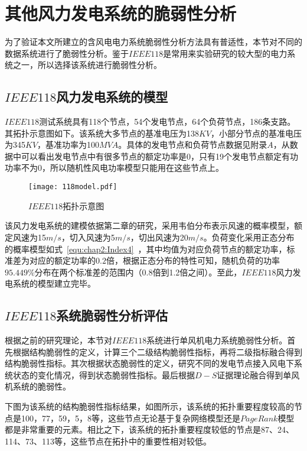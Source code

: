 \section{其他风力发电系统的脆弱性分析}
\label{sec:otherSystemVuln}
为了验证本文所建立的含风电电力系统脆弱性分析方法具有普适性，本节对不同的数据系统进行了脆弱性分析。鉴于$IEEE118$是常用来实验研究的较大型的电力系统之一，所以选择该系统进行脆弱性分析。

\subsection{$IEEE118$风力发电系统的模型}
\label{sec:118model}
$IEEE118$测试系统具有118个节点，54个发电节点，64个负荷节点，186条支路。其拓扑示意图如下。该系统大多节点的基准电压为138$KV$，小部分节点的基准电压为345$KV$，基准功率为100$MVA$。具体的发电节点和负荷节点数据见附录$A$，从数据中可以看出发电节点中有很多节点的额定功率是0，只有19个发电节点额定有功功率不为0，所以随机性风电功率模型只能用在这些节点上。
\begin{figure}[H] %
  \centering
  \texttt{[image: 118model.pdf]}
  \caption{$IEEE118$拓扑示意图}
  \label{fig:118model}
\end{figure}

该风力发电系统的建模依据第二章的研究，采用韦伯分布表示风速的概率模型，额定风速为15$m/s$，切入风速为5$m/s$，切出风速为20$m/s$。负荷变化采用正态分布的概率模型如式~\ref{equ:chap2:Index4}~，其中均值为对应负荷节点的额定功率，标准差为对应的额定功率的$0.2$倍，根据正态分布的特性可知，随机负荷的功率$95.449\%$分布在两个标准差的范围内（0.8倍到1.2倍之间）。至此，$IEEE118$风力发电系统的模型建立完毕。

\subsection{$IEEE118$系统脆弱性分析评估}
\label{sec:multiAnalysis118}
根据之前的研究理论，本节对$IEEE118$系统进行单风机电力系统脆弱性分析。首先根据结构脆弱性的定义，计算三个二级结构脆弱性指标，再将二级指标融合得到结构脆弱性指标。其次根据状态脆弱性的定义，研究不同的发电节点接入风电下系统状态的变化情况，得到状态脆弱性指标。最后根据$D-S$证据理论融合得到单风机系统的脆弱性。

下图为该系统的结构脆弱性指标结果，如图所示，该系统的拓扑重要程度较高的节点是100，77，59，5，8等，这些节点无论基于复杂网络模型还是$PageRank$模型都是非常重要的元素。相比之下，该系统的拓扑重要程度较低的节点是87、24、114、73、113等，这些节点在拓扑中的重要性相对较低。
\begin{figure}[H]
\end{figure}

